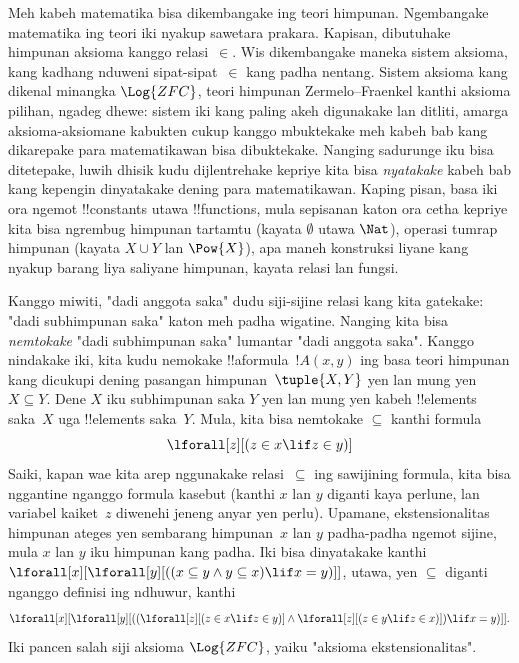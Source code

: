 \documentclass[../../../include/open-logic-section]{subfiles}
\begin{document}


Meh kabeh matematika bisa dikembangake ing teori himpunan.
Ngembangake matematika ing teori iki nyakup sawetara prakara.
Kapisan, dibutuhake himpunan aksioma kanggo relasi~$\in$.
Wis dikembangake maneka sistem aksioma, kang kadhang
nduweni sipat-sipat~$\in$ kang padha nentang.
Sistem aksioma kang dikenal minangka $\Log{ZFC}$,
teori himpunan Zermelo--Fraenkel kanthi aksioma pilihan,
ngadeg dhewe: sistem iki kang paling akeh digunakake
lan ditliti, amarga aksioma-aksiomane kabukten cukup
kanggo mbuktekake meh kabeh bab kang dikarepake
para matematikawan bisa dibuktekake. Nanging sadurunge
iku bisa ditetepake, luwih dhisik kudu dijlentrehake
kepriye kita bisa \emph{nyatakake} kabeh bab kang
kepengin dinyatakake dening para matematikawan.
Kaping pisan, basa iki ora ngemot !!{constant}s
utawa !!{function}s, mula sepisanan katon ora cetha
kepriye kita bisa ngrembug himpunan tartamtu
(kayata $\emptyset$ utawa $\Nat$), operasi tumrap
himpunan (kayata $X \cup Y$ lan $\Pow{X}$),
apa maneh konstruksi liyane kang nyakup barang
liya saliyane himpunan, kayata relasi lan fungsi.

Kanggo miwiti, "dadi anggota saka" dudu siji-sijine
relasi kang kita gatekake: "dadi subhimpunan saka"
katon meh padha wigatine. Nanging kita bisa
\emph{nemtokake} "dadi subhimpunan saka" lumantar
"dadi anggota saka". Kanggo nindakake iki,
kita kudu nemokake !!a{formula}~$!A(x, y)$
ing basa teori himpunan kang dicukupi dening
pasangan himpunan~$\tuple{X, Y}$ yen lan mung
yen $X \subseteq Y$. Dene $X$ iku subhimpunan
saka $Y$ yen lan mung yen kabeh !!{element}s
saka~$X$ uga !!{element}s saka~$Y$. Mula,
kita bisa nemtokake $\subseteq$ kanthi formula
\[
\lforall[z][(z \in x \lif z \in y)]
\]
Saiki, kapan wae kita arep nggunakake relasi~$\subseteq$
ing sawijining formula, kita bisa nggantine
nganggo formula kasebut (kanthi $x$ lan $y$ diganti
kaya perlune, lan variabel kaiket~$z$ diwenehi
jeneng anyar yen perlu). Upamane, ekstensionalitas
himpunan ateges yen sembarang himpunan~$x$ lan $y$
padha-padha ngemot sijine, mula $x$ lan $y$ iku
himpunan kang padha. Iki bisa dinyatakake kanthi
$\lforall[x][\lforall[y][((x \subseteq y \land y
    \subseteq x) \lif x = y)]]$, utawa, yen
$\subseteq$ diganti nganggo definisi ing ndhuwur,
kanthi
\[
\lforall[x][\lforall[y][((\lforall[z][(z \in x \lif z \in y)] \land
    \lforall[z][(z \in y \lif z \in x)]) \lif x = y)]].
\]
Iki pancen salah siji aksioma $\Log{ZFC}$, yaiku
"aksioma ekstensionalitas".
\end{document}
